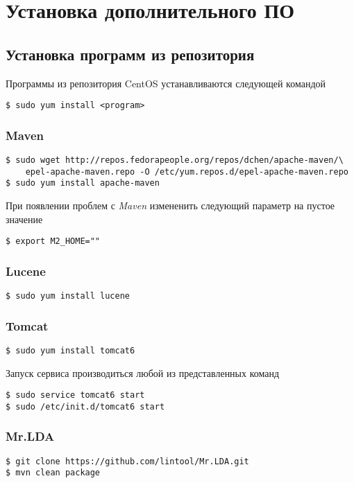 \chapter{Установка дополнительного ПО}
\section{Установка программ из репозитория}
Программы из репозитория CentOS устанавливаются следующей командой
\begin{lstlisting}
$ sudo yum install <program>
\end{lstlisting}

\subsection{Maven}
\begin{lstlisting}
$ sudo wget http://repos.fedorapeople.org/repos/dchen/apache-maven/\
    epel-apache-maven.repo -O /etc/yum.repos.d/epel-apache-maven.repo
$ sudo yum install apache-maven
\end{lstlisting}
При появлении проблем с \emph{Maven} измененить следующий параметр на пустое значение
\begin{lstlisting}
$ export M2_HOME=""
\end{lstlisting} 

\subsection{Lucene}
\begin{lstlisting}
$ sudo yum install lucene
\end{lstlisting}

\subsection{Tomcat}
\begin{lstlisting}
$ sudo yum install tomcat6
\end{lstlisting}
Запуск сервиса производиться любой из представленных команд
\begin{lstlisting}
$ sudo service tomcat6 start
$ sudo /etc/init.d/tomcat6 start
\end{lstlisting}

\subsection{Mr.LDA}
\begin{lstlisting}
$ git clone https://github.com/lintool/Mr.LDA.git
$ mvn clean package
\end{lstlisting}

